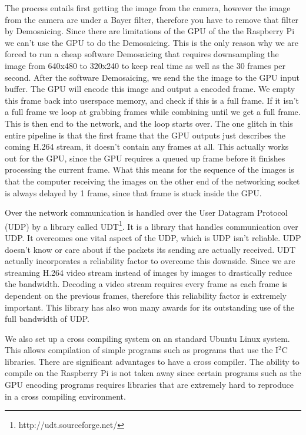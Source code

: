 \documentclass[conference, onecolumn, 12pt]{IEEEtran}
\begin{document}
The process entails first getting the image from the camera, however the image from the camera are under a Bayer filter, therefore you have to remove that filter by Demosaicing. Since there are limitations of the GPU of the the Raspberry Pi we can't use the GPU to do the Demosaicing. This is the only reason why we are forced to run a cheap software Demosaicing that requires downsampling the image from 640x480 to 320x240 to keep real time as well as the 30 frames per second. After the software Demosaicing, we send the the image to the GPU input buffer. The GPU will encode this image and output a encoded frame. We empty this frame back into userspace memory, and check if this is a full frame. If it isn't a full frame we loop at grabbing frames while combining until we get a full frame. This is then end to the network, and the loop starts over. The one glitch in this entire pipeline is that the first frame that the GPU outputs just describes the coming H.264 stream, it doesn't contain any frames at all. This actually works out for the GPU, since the GPU requires a queued up frame before it finishes processing the current frame. What this means for the sequence of the images is that the computer receiving the images on the other end of the networking socket is always delayed by 1 frame, since that frame is stuck inside the GPU.

Over the network communication is handled over the User Datagram Protocol (UDP) by a library called UDT\footnote{http://udt.sourceforge.net/}. It is a library that handles communication over UDP. It overcomes one vital aspect of the UDP, which is UDP isn't reliable. UDP doesn't know or care about if the packets its sending are actually received. UDT actually incorporates a reliability factor to overcome this downside. Since we are streaming H.264 video stream instead of images by images to drastically reduce the bandwidth. Decoding a video stream requires every frame as each frame is dependent on the previous frames, therefore this reliability factor is extremely important. This library has also won many awards for its outstanding use of the full bandwidth of UDP.

We also set up a cross compiling system on an standard Ubuntu Linux system. This allows compilation of simple programs such as programs that use the I$^2$C libraries. There are significant advantages to have a cross compiler. The ability to compile on the Raspberry Pi is not taken away since certain programs such as the GPU encoding programs requires libraries that are extremely hard to reproduce in a cross compiling environment.
\end{document}
